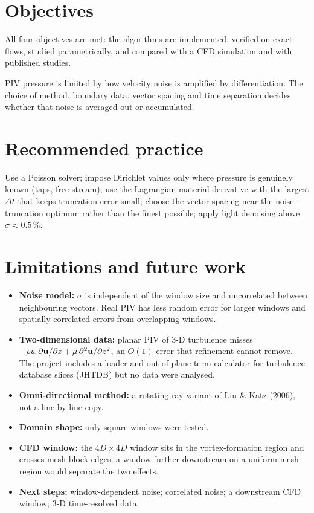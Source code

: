 \section{Objectives}
All four objectives are met: the algorithms are implemented, verified on exact flows, studied parametrically, and compared with a CFD simulation and with published studies.

\begin{keyidea}
PIV pressure is limited by how velocity noise is amplified by differentiation. The choice of method, boundary data, vector spacing and time separation decides whether that noise is averaged out or accumulated.
\end{keyidea}

\section{Recommended practice}
Use a Poisson solver; impose Dirichlet values only where pressure is genuinely known (taps, free stream); use the Lagrangian material derivative with the largest $\Delta t$ that keeps truncation error small; choose the vector spacing near the noise--truncation optimum rather than the finest possible; apply light denoising above $\sigma\approx0.5\,\%$.

\section{Limitations and future work}
\begin{itemize}
\item \textbf{Noise model:} $\sigma$ is independent of the window size and uncorrelated between neighbouring vectors. Real PIV has less random error for larger windows and spatially correlated errors from overlapping windows.
\item \textbf{Two-dimensional data:} planar PIV of 3-D turbulence misses $-\rho w\,\partial\mathbf{u}/\partial z+\mu\,\partial^2\mathbf{u}/\partial z^2$, an $O(1)$ error that refinement cannot remove. The project includes a loader and out-of-plane term calculator for turbulence-database slices (JHTDB) but no data were analysed.
\item \textbf{Omni-directional method:} a rotating-ray variant of Liu \& Katz (2006), not a line-by-line copy.
\item \textbf{Domain shape:} only square windows were tested.
\item \textbf{CFD window:} the $4D\times4D$ window sits in the vortex-formation region and crosses mesh block edges; a window further downstream on a uniform-mesh region would separate the two effects.
\item \textbf{Next steps:} window-dependent noise; correlated noise; a downstream CFD window; 3-D time-resolved data.
\end{itemize}
